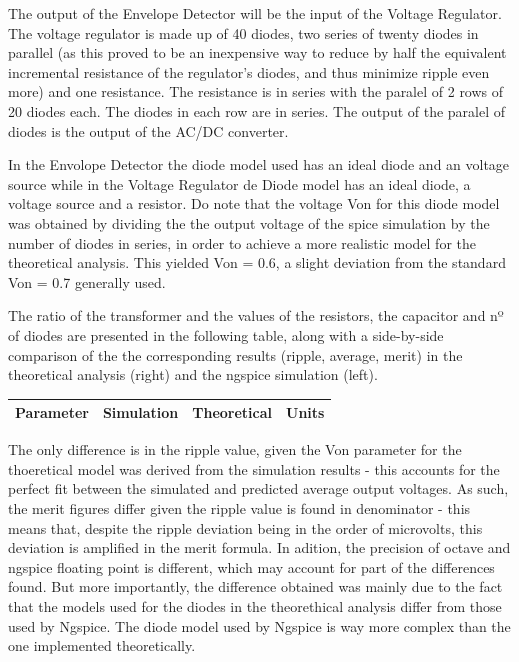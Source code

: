The output of the Envelope Detector will be the input of the Voltage Regulator. The voltage regulator is made up of 40 diodes, two series of twenty diodes in parallel (as this proved to be an inexpensive way to reduce by half the equivalent incremental resistance of the regulator's diodes, and thus minimize ripple even more) and one resistance. The resistance is in series with the paralel of 2 rows of 20 diodes each. The diodes in each row are in series. The output of the paralel of diodes is the output of the AC/DC converter.

In the Envolope Detector the diode model used has an ideal diode and an voltage source while in the Voltage Regulator de Diode model has an ideal diode, a voltage source and a resistor. Do note that the voltage Von for this diode model was obtained by dividing the the output voltage of the spice simulation by the number of diodes in series, in order to achieve a more realistic model for the theoretical analysis. This yielded Von = 0.6, a slight deviation from the standard Von = 0.7 generally used.

The ratio of the transformer and the values of the resistors, the capacitor and nº of diodes are presented in the following table, along with a side-by-side comparison of the the corresponding results (ripple, average, merit) in the theoretical analysis (right) and the ngspice simulation (left).

\hfill
 \parbox{1\linewidth}{
  \centering
  \begin{tabular}{|l|l|l|r|}
    {\bf Parameter} & {\bf Simulation} & {\bf Theoretical } & {\bf Units }\\ \hline
    
  \end{tabular}
  \label{tab:results}
    

  }
    The only difference is in the ripple value, given the Von parameter for the thoeretical model was derived from the simulation results - this accounts for the perfect fit between the simulated and predicted average output voltages. As such, the merit figures differ given the ripple value is found in denominator - this means that, despite the ripple deviation being in the order of microvolts, this deviation is amplified in the merit formula. In adition, the precision of octave and ngspice floating point is different, which may account for part of the differences found. But more importantly, the difference obtained was mainly due to the fact that the models
used for the diodes in the theorethical analysis differ from those used by Ngspice. The diode
model used by Ngspice is way more complex than the one implemented theoretically.
  
